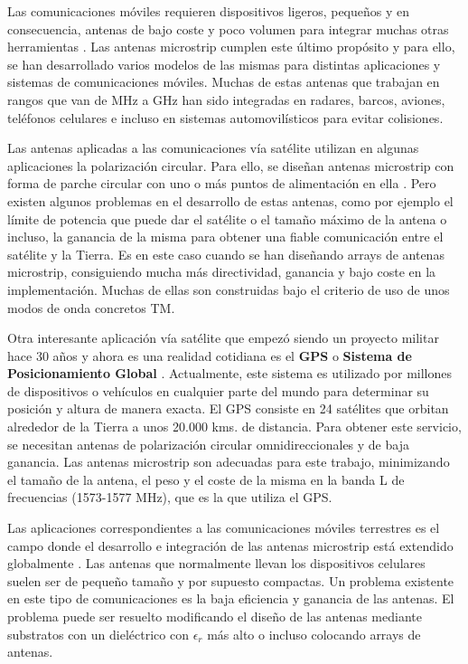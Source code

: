 Las comunicaciones móviles requieren dispositivos ligeros, pequeños y en consecuencia, antenas de bajo coste y poco volumen para integrar muchas otras herramientas \cite{james2}\cite{huang}. Las antenas microstrip cumplen este último propósito y para ello, se han desarrollado varios modelos de las mismas para distintas aplicaciones y sistemas de comunicaciones móviles. Muchas de estas antenas que trabajan en rangos que van de MHz a GHz han sido integradas en radares, barcos, aviones, teléfonos celulares e incluso en sistemas automovilísticos para evitar colisiones.

Las antenas aplicadas a las comunicaciones vía satélite utilizan en algunas aplicaciones la polarización circular. Para ello, se diseñan antenas microstrip con forma de parche circular con uno o más puntos de alimentación en ella \cite{garg8}. Pero existen algunos problemas en el desarrollo de estas antenas, como por ejemplo el límite de potencia que puede dar el satélite o el tamaño máximo de la antena o incluso, la ganancia de la misma para obtener una fiable comunicación entre el satélite y la Tierra. Es en este caso cuando se han diseñando arrays de antenas microstrip, consiguiendo mucha más directividad, ganancia y bajo coste en la implementación. Muchas de ellas son construidas bajo el criterio de uso de unos modos de onda concretos TM.

Otra interesante aplicación vía satélite que empezó siendo un proyecto militar hace 30 años y ahora es una realidad cotidiana es el \textbf{GPS} o \textbf{Sistema de Posicionamiento Global} \cite{garg1}. Actualmente, este sistema es utilizado por millones de dispositivos o vehículos en cualquier parte del mundo para determinar su posición y altura de manera exacta. El GPS consiste en 24 satélites que orbitan alrededor de la Tierra a unos 20.000 kms. de distancia. Para obtener este servicio, se necesitan antenas de polarización circular omnidireccionales y de baja ganancia. Las antenas microstrip son adecuadas para este trabajo, minimizando el tamaño de la antena, el peso y el coste de la misma en la banda L de frecuencias (1573-1577 MHz), que es la que utiliza el GPS.

Las aplicaciones correspondientes a las comunicaciones móviles terrestres es el campo donde el desarrollo e integración de las antenas microstrip está extendido globalmente \cite{garg1}. Las antenas que normalmente llevan los dispositivos celulares suelen ser de pequeño tamaño y por supuesto compactas. Un problema existente en este tipo de comunicaciones es la baja eficiencia y ganancia de las antenas. El problema puede ser resuelto modificando el diseño de las antenas mediante substratos con un dieléctrico con $\epsilon_r$ más alto o incluso colocando arrays de antenas.

